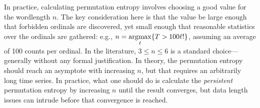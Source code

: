 \documentclass{article}
\begin{document}
In practice, calculating permutation entropy involves choosing a good
value for the wordlength $n$. The key consideration
here is that the value be large enough that forbidden ordinals are
discovered, yet small enough that reasonable statistics over the
ordinals are gathered: e.g., $\displaystyle n =
\operatornamewithlimits{argmax}_\ell\{T > 100 \ell!\}$, assuming an
average of 100 counts per ordinal. In the literature, $3\le n \le 6$
is a standard choice---generally without any formal justification. In
theory, the permutation entropy should reach an asymptote with
increasing $n$, but that requires an arbitrarily long time series. In
practice, what one should do is calculate the \emph{persistent}
permutation entropy by increasing $n$ until the result converges, but
data length issues can intrude before that convergence is reached.
\end{document}

